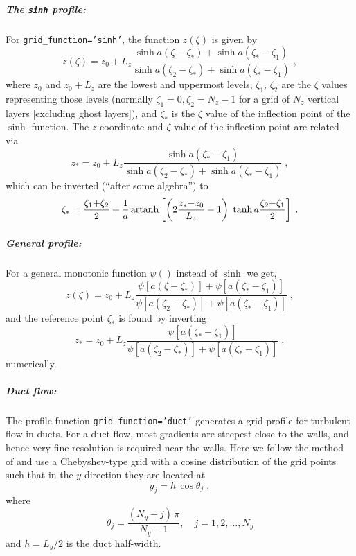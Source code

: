 \documentclass[\mydriver,12pt,twoside,notitlepage,a4paper]{article}
\newcommand{\code}[1]{\texttt{#1}}
\newcommand{\artanh}  {\mathop{\rm artanh}\nolimits}
\begin{document}
\subparagraph{The \code{sinh} profile:}
For \code{grid_function='sinh'}, the function $z(\zeta)$ is given by
\begin{equation}
  z(\zeta)
  = z_0
    + L_z \frac{\sinh a(\zeta  {-}\zeta_*) + \sinh a(\zeta_*{-}\zeta_1)}
               {\sinh a(\zeta_2{-}\zeta_*) + \sinh a(\zeta_*{-}\zeta_1)} \; ,
\end{equation}
where $z_0$ and $z_0+L_z$ are the lowest and uppermost levels,
$\zeta_1$, $\zeta_2$ are the $\zeta$ values representing those levels
(normally $\zeta_1 = 0, \zeta_2 = N_z-1$ for a grid of $N_z$ vertical
layers [excluding ghost layers]), and $\zeta_*$ is the
$\zeta$ value of the inflection point of the $\sinh$ function.
The $z$ coordinate and $\zeta$ value of the inflection point are related
via
\begin{equation}
  z_*
  = z_0
    + L_z \frac{\sinh a(\zeta_*{-}\zeta_1)}
               {\sinh a(\zeta_2{-}\zeta_*) + \sinh a(\zeta_*{-}\zeta_1)} \; ,
\end{equation}
which can be inverted (``after some algebra'') to
\begin{equation}
  \zeta_*
  = \frac{\zeta_1{+}\zeta_2}{2}
    + \frac{1}{a}
      \artanh \left[  \left(2\frac{z_*{-}z_0}{L_z}-1\right)\;
                      \tanh a \frac{\zeta_2{-}\zeta_1}{2}
              \right] \; .
\end{equation}

\subparagraph{General profile:}
For a general monotonic function $\psi()$ instead of $\sinh$ we get,
\begin{equation}
  z(\zeta)
  = z_0
    + L_z \frac{\psi[a(\zeta  {-}\zeta_*)] + \psi[a(\zeta_*{-}\zeta_1)]}
               {\psi[a(\zeta_2{-}\zeta_*)] + \psi[a(\zeta_*{-}\zeta_1)]} \; ,
\end{equation}
and the reference point $\zeta_*$ is found by inverting
\begin{equation}
  z_*
  = z_0
    + L_z \frac{\psi[a(\zeta_*{-}\zeta_1)]}
               {\psi[a(\zeta_2{-}\zeta_*)] + \psi[a(\zeta_*{-}\zeta_1)]} \; ,
\end{equation}
numerically.

\subparagraph{Duct flow:}
The profile function \code{grid_function='duct'} generates a grid profile
for turbulent flow in ducts.
For a duct flow, most gradients are steepest close to the walls, and hence
very fine resolution is required near the walls.
Here we follow the method of \cite{kim87} and use a Chebyshev-type grid
with a cosine distribution of the grid points such that in the $y$
direction they are located at
\begin{equation}
  \label{deltay}
  y_j = h \, \cos \theta_j \; ,
\end{equation}
where
\begin{equation}
  \theta_j = \frac{(N_y{-}j)\,\pi}{N_y{-}1}, \quad j=1, 2, \ldots, N_y
\end{equation}
and $h=L_y/2$ is the duct half-width.
\end{document}
